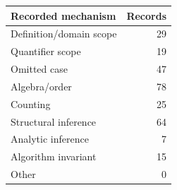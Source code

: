 \begin{tabular}{lr}
\toprule
Recorded mechanism & Records \\
\midrule
Definition/domain scope & 29 \\
Quantifier scope & 19 \\
Omitted case & 47 \\
Algebra/order & 78 \\
Counting & 25 \\
Structural inference & 64 \\
Analytic inference & 7 \\
Algorithm invariant & 15 \\
Other & 0 \\
\bottomrule
\end{tabular}
